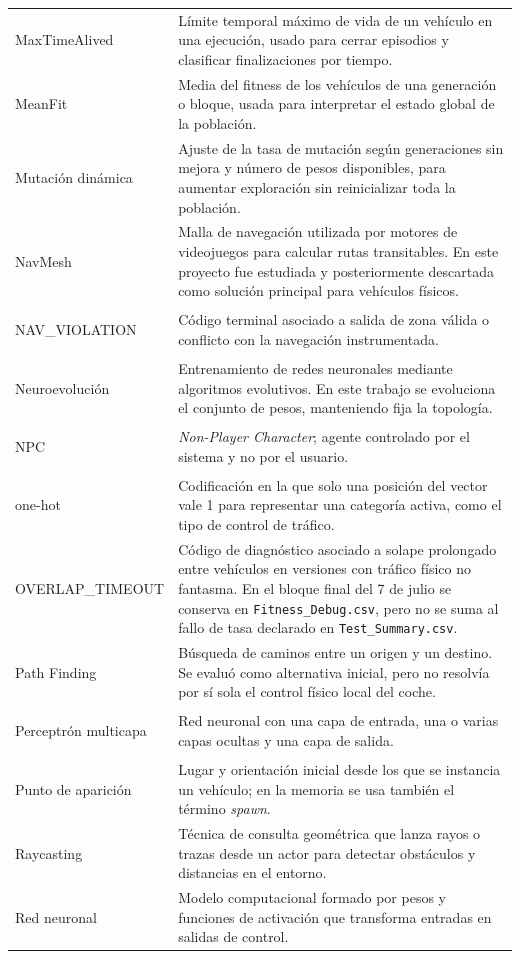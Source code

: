 \begin{longtable}{>{\bfseries\raggedright\arraybackslash}p{4.7cm}L{9.3cm}}
MaxTimeAlived & Límite temporal máximo de vida de un vehículo en una ejecución, usado para cerrar episodios y clasificar finalizaciones por tiempo.\\
MeanFit & Media del fitness de los vehículos de una generación o bloque, usada para interpretar el estado global de la población.\\
Mutación dinámica & Ajuste de la tasa de mutación según generaciones sin mejora y número de pesos disponibles, para aumentar exploración sin reinicializar toda la población.\\
NavMesh & Malla de navegación utilizada por motores de videojuegos para calcular rutas transitables. En este proyecto fue estudiada y posteriormente descartada como solución principal para vehículos físicos.\\
NAV\_VIOLATION & Código terminal asociado a salida de zona válida o conflicto con la navegación instrumentada.\\
Neuroevolución & Entrenamiento de redes neuronales mediante algoritmos evolutivos. En este trabajo se evoluciona el conjunto de pesos, manteniendo fija la topología.\\
NPC & \textit{Non-Player Character}; agente controlado por el sistema y no por el usuario.\\
one-hot & Codificación en la que solo una posición del vector vale 1 para representar una categoría activa, como el tipo de control de tráfico.\\
OVERLAP\_TIMEOUT & Código de diagnóstico asociado a solape prolongado entre vehículos en versiones con tráfico físico no fantasma. En el bloque final del 7 de julio se conserva en \texttt{Fitness\_Debug.csv}, pero no se suma al fallo de tasa declarado en \texttt{Test\_Summary.csv}.\\
Path Finding & Búsqueda de caminos entre un origen y un destino. Se evaluó como alternativa inicial, pero no resolvía por sí sola el control físico local del coche.\\
Perceptrón multicapa & Red neuronal con una capa de entrada, una o varias capas ocultas y una capa de salida.\\
Punto de aparición & Lugar y orientación inicial desde los que se instancia un vehículo; en la memoria se usa también el término \textit{spawn}.\\
Raycasting & Técnica de consulta geométrica que lanza rayos o trazas desde un actor para detectar obstáculos y distancias en el entorno.\\
Red neuronal & Modelo computacional formado por pesos y funciones de activación que transforma entradas en salidas de control.\\

\end{longtable}
